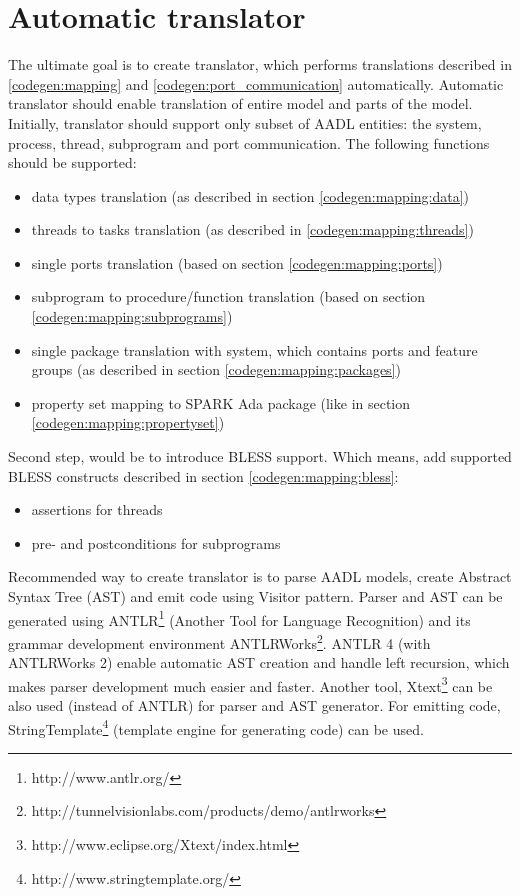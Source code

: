 \section{Automatic translator}
\label{codegen:translator}

The ultimate goal is to create translator, which performs translations described in \ref{codegen:mapping} and \ref{codegen:port_communication} automatically. Automatic translator should enable translation of entire model and parts of the model. Initially, translator should support only subset of AADL entities: the system, process, thread, subprogram and port communication. The following functions should be supported:
\begin{itemize}
	\item data types translation (as described in section \ref{codegen:mapping:data})
	\item threads to tasks translation (as described in \ref{codegen:mapping:threads})
	\item single ports translation (based on section \ref{codegen:mapping:ports})
	\item subprogram to procedure/function translation (based on section \ref{codegen:mapping:subprograms})
	\item single package translation with system, which contains ports and feature groups (as described in section \ref{codegen:mapping:packages})
	\item property set mapping to SPARK Ada package (like in section \ref{codegen:mapping:propertyset})
\end{itemize}

Second step, would be to introduce BLESS support. Which means, add supported BLESS constructs described in section \ref{codegen:mapping:bless}:
\begin{itemize}
	\item assertions for threads
	\item pre- and postconditions for subprograms
\end{itemize}

Recommended way to create translator is to parse AADL models, create Abstract Syntax Tree (AST) and emit code using Visitor pattern. Parser and AST can be generated using ANTLR\footnote{http://www.antlr.org/} (Another Tool for Language Recognition) and its grammar development environment ANTLRWorks\footnote{http://tunnelvisionlabs.com/products/demo/antlrworks}. ANTLR 4 (with ANTLRWorks 2) enable automatic AST creation and handle left recursion, which makes parser development much easier and faster. Another tool, Xtext\footnote{http://www.eclipse.org/Xtext/index.html} can be also used (instead of ANTLR) for parser and AST generator. For emitting code, StringTemplate\footnote{http://www.stringtemplate.org/} (template engine for generating code) can be used. 

